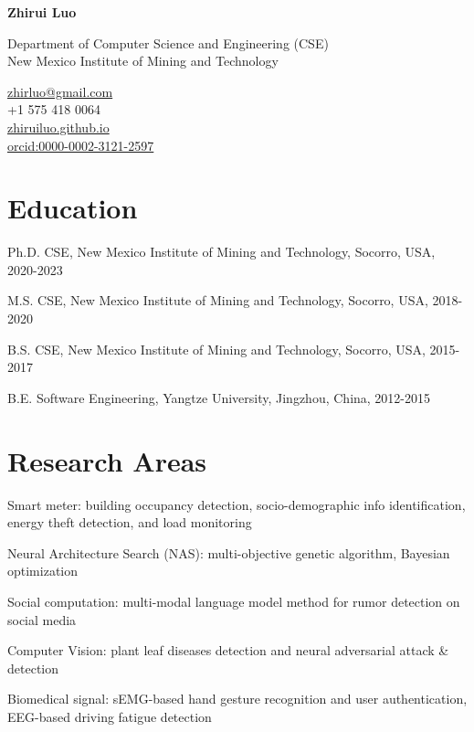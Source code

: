 \documentclass[12pt,letterpaper]{report}
\newcommand{\myname}{Zhirui Luo}
\newcommand{\namefont}[1]{{\normalfont\bfseries\Huge{#1}}}
\newcommand{\listitemspace}{0.25em}
\renewenvironment{itemize}
{\begin{list}{}{\setlength{\leftmargin}{0em}
                \setlength{\parskip}{0em}
                \setlength{\itemsep}{\listitemspace}
                \setlength{\parsep}{\listitemspace}}}
{\end{list}}
\begin{document}
    \raggedright{}

    \namefont{\myname}

    \vspace{1em}
    \begin{minipage}[t]{0.700\textwidth}
        Department of Computer Science and Engineering (CSE)\\
        New Mexico Institute of Mining and Technology
    \end{minipage}
    \begin{minipage}[t]{0.295\textwidth}
        \flushright{}
        \href{mailto:zhirluo@gmail.com}{zhirluo@gmail.com} \\
        +1 575 418 0064 \\
        \href{https://zhiruiluo.github.io}{zhiruiluo.github.io}\\
        \href{https://orcid.org/0000-0002-3121-2597}{orcid:0000-0002-3121-2597}
    \end{minipage}

    \section*{Education}
    
    \begin{tablist}
      \item[Ph.D.] \tab{}CSE, New Mexico Institute of Mining and Technology, Socorro, USA, 2020-2023
      \item[M.S.] \tab{}CSE, New Mexico Institute of Mining and Technology, Socorro, USA, 2018-2020
      \item[B.S.] \tab{}CSE, New Mexico Institute of Mining and Technology, Socorro, USA, 2015-2017
      \item[B.E.] \tab{}Software Engineering, Yangtze University, Jingzhou, China, 2012-2015
    \end{tablist}
    
    \section*{Research Areas}
    \begin{itemize}
      \item Smart meter: building occupancy detection, socio-demographic info identification, energy theft detection, and load monitoring
      \item Neural Architecture Search (NAS): multi-objective genetic algorithm, Bayesian optimization
      \item Social computation: multi-modal language model method for rumor detection on social media
      \item Computer Vision: plant leaf diseases detection and neural adversarial attack \& detection
      \item Biomedical signal: sEMG-based hand gesture recognition and user authentication, EEG-based driving fatigue detection
    \end{itemize}
    
\end{document}
